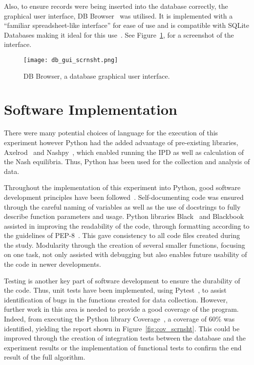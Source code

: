 Also, to ensure records were being inserted into the database correctly, the
graphical user interface, DB Browser~\cite{piacentini2015db} was utilised. It is implemented
with a ``familiar spreadsheet-like interface'' for ease of use and is compatible
with SQLite Databases making it ideal for this use~\cite{piacentini2015db}. See Figure~\ref{fig:db_browser_scrnsht},
for a screenshot of the interface.

\begin{figure}
    \centering
    \texttt{[image: db\_gui\_scrnsht.png]}
    \caption{DB Browser, a database graphical user interface.}\label{fig:db_browser_scrnsht}
\end{figure}


\section{Software Implementation}\label{sec:Software_Implementation}
There were many potential choices of language for the execution of this 
experiment however Python had the added advantage of pre-existing libraries, 
Axelrod~\cite{axelrodproject} and Nashpy~\cite{Nashpy2019}, which enabled running the IPD as well as calculation of the 
Nash equilibria. Thus, Python has been used for the collection and analysis of 
data.

Throughout the implementation of this experiment into Python, good software
development principles have been followed~\cite{Jimenez2017, Sandve2013, Wilson2014}. Self-documenting code was 
ensured through the careful naming of variables as well as the use of 
docstrings to fully describe function parameters and usage. Python libraries 
Black~\cite{Langa2019} and Blackbook~\cite{Knight2019a} assisted in improving the readability of the code, through 
formatting according to the guidelines of PEP-8~\cite{Rossum2001}. This gave consistency to all 
code files created during the study. Modularity through the creation of several 
smaller functions, focusing on one task, not only assisted with debugging but 
also enables future usability of the code in newer developments.

Testing is another key part of software development to ensure the durability of 
the code. Thus, unit tests have been implemented, using Pytest~\cite{pytestx.y}, to assist 
identification of bugs in the functions created for data collection. However, 
further work in this area is needed to provide a good coverage of the program. 
Indeed, from executing the Python library Coverage~\cite{Batchelder2020}, a coverage of 60\% was identified, 
yielding the report shown in Figure~\ref{fig:cov_scrnsht}. This could be improved through the creation of 
integration tests between the database and the experiment results or the 
implementation of functional tests to confirm the end result of the full 
algorithm.

